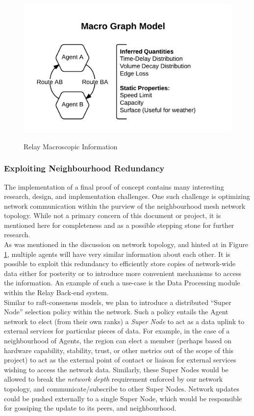 \documentclass{article}
\begin{document}
\begin{figure}[!htpb]
	\caption{Relay Macroscopic Information}
	\includegraphics[width=\textwidth]{figures/Relay_Macro_Graph.png}
	\label{fig:Relay_Macro_Graph}
\end{figure}

\subsubsection{Exploiting Neighbourhood Redundancy}

The implementation of a final proof of concept contains many interesting research, design, and implementation challenges.
One such challenge is optimizing network communication within the purview of the neighbourhood mesh network topology.
While not a primary concern of this document or project, it is mentioned here for completeness and as a possible stepping stone for further research.\\

As was mentioned in the discussion on network topology, and hinted at in Figure \ref{fig:Relay_Macro_Graph}, multiple agents will have very similar information about each other.
It is possible to exploit this redundancy to efficiently store copies of network-wide data either for posterity or to introduce more convenient mechanisms to access the information.
An example of such a use-case is the Data Processing module within the Relay Back-end system.\\

Similar to raft-consensus models, we plan to introduce a distributed ``Super Node'' selection policy within the network.
Such a policy entails the Agent network to elect (from their own ranks) a \emph{Super Node} to act as a data uplink to external services for particular pieces of data.
For example, in the case of a neighbourhood of Agents, the region can elect a member (perhaps based on hardware capability, stability, trust, or other metrics out of the scope of this project) to act as the external point of contact or liaison for external services wishing to access the network data.
Similarly, these Super Nodes would be allowed to break the \emph{network depth} requirement enforced by our network topology, and communicate/subscribe to other Super Nodes.
Network updates could be pushed externally to a single Super Node, which would be responsible for gossiping the update to its peers, and neighbourhood.\\
\end{document}
